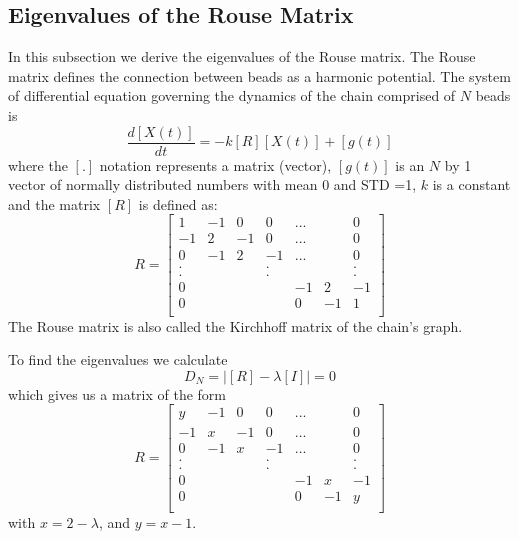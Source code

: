 \documentclass{report}
\begin{document}
\subsection{Eigenvalues of the Rouse Matrix}\label{subsection_eigenvaluesOfTheRouseMatrix}
In this subsection we derive the eigenvalues of the Rouse matrix. The Rouse matrix defines the connection between beads as a harmonic potential. The system of differential equation governing the dynamics of the chain comprised of $N$ beads is 
\begin{equation}
\frac{d[X(t)]}{dt}=-k[R][X(t)]+[g(t)]
\end{equation}
where the $[.]$ notation represents a matrix (vector), $[g(t)]$ is an $N$ by 1 vector of normally distributed numbers with mean 0 and STD =1, $k$ is a constant and the matrix $[R]$ is defined as:
\begin{equation}
R=\left[
\begin{matrix}
 1 & -1 &  0 &  0 &...&  &  0 \\
-1 &  2 & -1 &  0 &...&  &  0 \\
 0 & -1 &  2 & -1 &...&  &  0 \\
 . &    &    &  . &   &  &  . \\
 . &    &    &  . &   &  &  . \\
 0 &    &    &    & -1& 2& -1 \\
 0 &    &    &    &  0&-1&  1 \\     
\end{matrix}
\right]
\end{equation}
The Rouse matrix is also called the Kirchhoff matrix of the chain's graph.

To find the eigenvalues we calculate 
\begin{equation*}
D_N=\left|[R]-\lambda[I]\right|=0
\end{equation*}
which gives us a matrix of the form 
\begin{equation*}
R=\left[
\begin{matrix}
 y & -1 &  0 &  0 &...&  &  0 \\
-1 &  x & -1 &  0 &...&  &  0 \\
 0 & -1 &  x & -1 &...&  &  0 \\
 . &    &    &  . &   &  &  . \\
 . &    &    &  . &   &  &  . \\
 0 &    &    &    & -1& x& -1 \\
 0 &    &    &    &  0&-1&  y \\     
\end{matrix}
\right]
\end{equation*}
with $x=2-\lambda$, and $y=x-1$.
\end{document}
